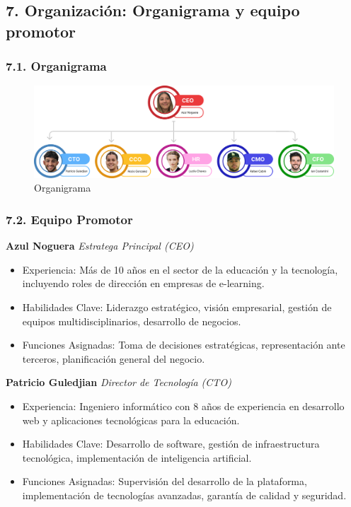 \documentclass[
]{article}
\providecommand{\tightlist}{%
  \setlength{\itemsep}{0pt}\setlength{\parskip}{0pt}}
\begin{document}
\newpage

\subsection{7. Organización: Organigrama y equipo
promotor}\label{organizaciuxf3n-organigrama-y-equipo-promotor}

\subsubsection{7.1. Organigrama}\label{organigrama}

\begin{figure}
\centering
\includegraphics[width=1\textwidth,height=\textheight]{img/Organigrama.png}
\caption{Organigrama}
\end{figure}

\subsubsection{7.2. Equipo Promotor}\label{equipo-promotor}

\textbf{Azul Noguera} \emph{Estratega Principal (CEO)}

\begin{itemize}
\tightlist
\item
  Experiencia: Más de 10 años en el sector de la educación y la
  tecnología, incluyendo roles de dirección en empresas de e-learning.
\item
  Habilidades Clave: Liderazgo estratégico, visión empresarial, gestión
  de equipos multidisciplinarios, desarrollo de negocios.
\item
  Funciones Asignadas: Toma de decisiones estratégicas, representación
  ante terceros, planificación general del negocio.
\end{itemize}

\textbf{Patricio Guledjian} \emph{Director de Tecnología (CTO)}

\begin{itemize}
\tightlist
\item
  Experiencia: Ingeniero informático con 8 años de experiencia en
  desarrollo web y aplicaciones tecnológicas para la educación.
\item
  Habilidades Clave: Desarrollo de software, gestión de infraestructura
  tecnológica, implementación de inteligencia artificial.
\item
  Funciones Asignadas: Supervisión del desarrollo de la plataforma,
  implementación de tecnologías avanzadas, garantía de calidad y
  seguridad.
\end{itemize}
\end{document}
